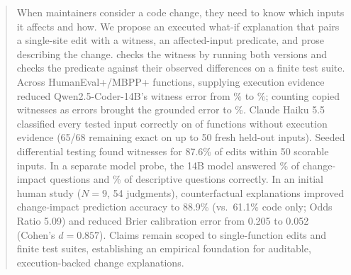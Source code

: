\begin{abstract}
When maintainers consider a code change, they need to know which inputs it affects and how. We propose an
executed what-if explanation that pairs a single-site edit with a witness, an affected-input predicate, and prose
describing the change. \CoDE checks the witness by running both versions and checks the predicate against their
observed differences on a finite test suite. Across \SNMutants{} HumanEval+/MBPP+ functions, supplying execution
evidence reduced Qwen2.5-Coder-14B's witness error from \PWitGenRawA\% to \PWitGenRawB\%; counting copied
witnesses as errors brought the grounded error to \PWitGenStrictB\%. Claude Haiku 5.5 classified every tested input
correctly on \SPredStrongUExactN{} of \SPredStrongN{} functions without execution evidence (65/68 remaining exact on up to 50 fresh held-out inputs). Seeded differential testing found witnesses for 87.6\% of edits within 50 scorable inputs. In a separate model probe, the 14B model answered \PProbePonefoursCF\% of
change-impact questions and \PProbePonefoursDESC\% of descriptive questions correctly. In an initial human study ($N=9$, 54 judgments), counterfactual explanations improved change-impact prediction accuracy to 88.9\% (vs.\ 61.1\% code only; Odds Ratio 5.09) and reduced Brier calibration error from 0.205 to 0.052 (Cohen's $d=0.857$). Claims remain scoped to single-function edits and finite test suites, establishing an empirical foundation for auditable, execution-backed change explanations.
\end{abstract}
